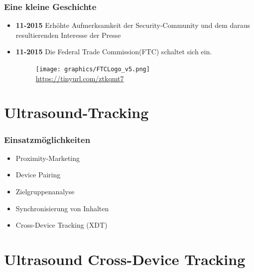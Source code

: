 \documentclass{beamer}
\begin{document}
		\begin{frame}\frametitle{Eine kleine Geschichte}
		\begin{itemize}
			\item \textbf{11-2015} Erhöhte Aufmerksamkeit der Security-Community und dem daraus resultierenden Interesse der Presse
			\item \textbf{11-2015} Die Federal Trade Commission(FTC) schaltet sich ein.
				\begin{figure}
				\centering
				\texttt{[image: graphics/FTCLogo\_v5.png]}\\
				\tiny\url{https://tinyurl.com/ztkqmt7}
				\end{figure}			
		\end{itemize}
		\end{frame}

\section{Ultrasound-Tracking}
		\begin{frame}\frametitle{Einsatzmöglichkeiten}
		\begin{itemize}
			\item Proximity-Marketing
			\item Device Pairing
			\item Zielgruppenanalyse
			\item Synchronisierung von Inhalten
			\item Cross-Device Tracking (XDT)			
		\end{itemize}
		\end{frame}

\section{Ultrasound Cross-Device Tracking}
\end{document}
